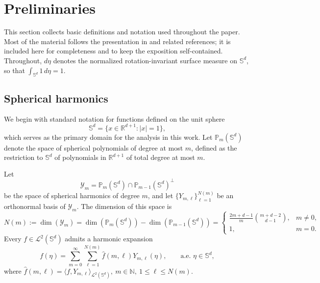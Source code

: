 \documentclass{article}
\numberwithin{equation}{section}
\begin{document}
\section{Preliminaries}\label{sec_prelimi}

This section collects basic definitions and notation used throughout the paper. 
Most of the material follows the presentation in \cite{liu2025integral} and related references; it is included here for completeness and to keep the exposition self-contained.
Throughout, $d\eta$ denotes the normalized rotation-invariant surface measure on $\mathbb S^d$, so that $\int_{\mathbb S^d}1\,d\eta=1$.

\medskip


\subsection{Spherical harmonics}
We begin with standard notation for functions defined on the unit sphere
\[
    \mathbb S^d=\{x\in\mathbb R^{d+1}:|x|=1\},
\]
which serves as the primary domain for the analysis in this work. Let
$\mathbb P_m(\mathbb S^d)$ denote the space of spherical polynomials of
degree at most $m$, defined as the restriction to $\mathbb S^d$ of
polynomials in $\mathbb R^{d+1}$ of total degree at most $m$.

Let
\[
    \mathcal Y_m
    =
    \mathbb P_m(\mathbb S^d)
    \cap
    \mathbb P_{m-1}(\mathbb S^d)^\perp
\]
be the space of spherical harmonics of degree $m$, and let
\(\{Y_{m,\ell}\}_{\ell=1}^{N(m)}\) be an orthonormal basis of
$\mathcal Y_m$. The dimension of this space is
\begin{equation}
    N(m):=\dim(\mathcal Y_m)
    =\dim(\mathbb P_m(\mathbb S^d))
     -\dim(\mathbb P_{m-1}(\mathbb S^d))
    =
    \begin{cases}
        \displaystyle
        \frac{2m+d-1}{m}\binom{m+d-2}{d-1},
        &m\neq0,\\[0.8em]
        1,
        &m=0.
    \end{cases}
\end{equation}
Every $f \in \mathcal{L}^2(\mathbb{S}^d)$ admits a harmonic expansion
\begin{equation}
    f(\eta)
    = \sum_{m=0}^\infty \sum_{\ell=1}^{N(m)} 
      \widehat f(m,\ell) Y_{m,\ell}(\eta), 
      \qquad \text{a.e. } \eta \in \mathbb{S}^d,
\end{equation}
where
\(
  \widehat f(m,\ell) = 
  \langle f, Y_{m,\ell} \rangle_{\mathcal{L}^2(\mathbb{S}^d)},
  \ m \in \mathbb{N}, \ 1 \le \ell \le N(m).
\)
\end{document}
